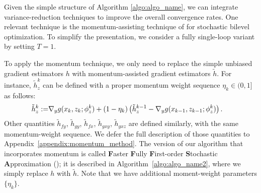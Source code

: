 Given the simple structure of Algorithm \ref{algo:algo_name}, we can integrate variance-reduction techniques to improve the overall convergence rates. 
One relevant technique is the momentum-assisting technique of \cite{khanduri2021near} for stochastic bilevel optimization. 
To simplify the presentation, we consider a fully single-loop variant by setting $T=1$. 

To apply the momentum technique, we only need to replace the simple unbiased gradient estimators $h$ with momentum-assisted gradient estimators $\tilde{h}$. 
For instance, $\tilde{h}_z^k$ can be defined with a proper momentum weight sequence $\eta_k \in (0,1]$ as follows:
\begin{align*}
    \tilde{h}_{z}^{k} := &\nabla_y g(x_k, z_{k}; \phi_{z}^{k}) + (1 - \eta_{k}) \left( \tilde{h}_{z}^{k-1} - \nabla_y g(x_{k-1}, z_{k-1}; \phi_{z}^{k}) \right).
\end{align*}
Other quantities $\tilde{h}_{fy}$, $\tilde{h}_{gy}$, $\tilde{h}_{fx}$, $\tilde{h}_{gxy}$, $\tilde{h}_{gxz}$ are defined similarly, with the same momentum-weight sequence. 
We defer the full description of those quantities to Appendix~\ref{appendix:momentum_method}. 
The version of our algorithm that incorporates momentum is called \textbf{F}aster \textbf{F}ully \textbf{F}irst-order \textbf{S}tochastic \textbf{A}pproximation (\algnametwo); it is described in Algorithm~\ref{algo:algo_name2}, where we simply replace $h$ with $\tilde{h}$. 
Note that we have additional moment-weight parameters $\{\eta_{k}\}$.







